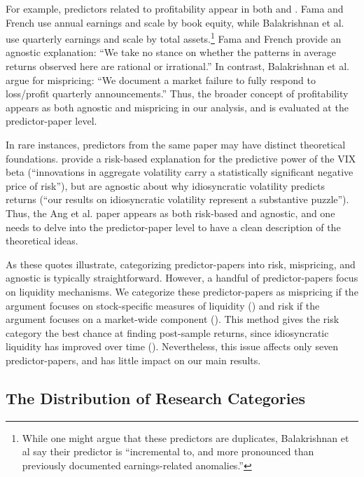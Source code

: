 For example, predictors related to profitability appear in both \citet{fama2006profitability} and \citet{balakrishnan2010post}. Fama and French use annual earnings and scale by book equity, while Balakrishnan et al. use quarterly earnings and scale by total assets.\footnote{%
While one might argue that these predictors are duplicates, Balakrishnan et al say their predictor is ``incremental to, and more pronounced than previously documented earnings-related anomalies.''
} %
Fama and French provide an agnostic explanation: ``We take no stance on whether the patterns in average returns observed here are rational or irrational.'' In contrast, Balakrishnan et al. argue for mispricing: ``We document a market failure to fully respond to loss/profit quarterly announcements.'' Thus, the broader concept of profitability appears as both agnostic and mispricing in our analysis, and is evaluated at the predictor-paper level. 

In rare instances, predictors from the same paper may have distinct theoretical foundations. \citet{ang2006cross} provide a risk-based explanation for the predictive power of the VIX beta (``innovations in aggregate volatility carry a statistically significant negative price of risk''), but are agnostic about why idiosyncratic volatility predicts returns (``our results on idiosyncratic volatility represent a substantive puzzle''). Thus, the Ang et al. paper appears as both risk-based and agnostic, and one needs to delve into the predictor-paper level to have a clean description of the theoretical ideas.

As these quotes illustrate, categorizing predictor-papers into risk, mispricing, and agnostic is typically straightforward. However, a handful of predictor-papers focus on liquidity mechanisms.  We categorize these predictor-papers as mispricing if the argument focuses on stock-specific measures of liquidity (\citealt{amihud2002illiquidity})  and risk if the argument focuses on a market-wide component (\citealt{pastor2003liquidity}). This method gives the risk category the best chance at finding post-sample returns, since idiosyncratic liquidity has improved over time (\citealt{chen2022zeroing}). Nevertheless, this issue affects only seven predictor-papers, and has little impact on our main results.


\subsection{The Distribution of Research Categories}\label{sec:hetero-distribution}

